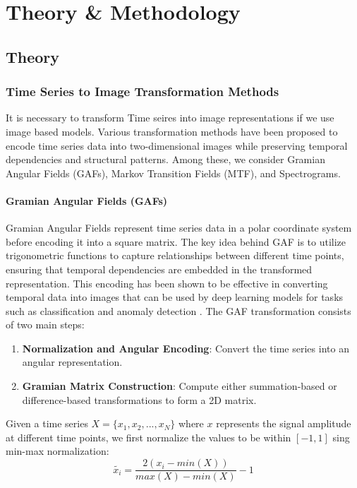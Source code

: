 \chapter{Theory \& Methodology}

\section{Theory}

\subsection{Time Series to Image Transformation Methods}

It is necessary to transform Time seires into image representations if we use image based models. Various transformation methods have been proposed to encode time series data into two-dimensional images while preserving temporal dependencies and structural patterns. Among these, we consider Gramian Angular Fields (GAFs), Markov Transition Fields (MTF), and Spectrograms.

\subsubsection*{Gramian Angular Fields (GAFs)}

Gramian Angular Fields represent time series data in a polar coordinate system before encoding it into a square matrix. The key idea behind GAF is to utilize trigonometric functions to capture relationships between different time points, ensuring that temporal dependencies are embedded in the transformed representation. This encoding has been shown to be effective in converting temporal data into images that can be used by deep learning models for tasks such as classification and anomaly detection \parencite{wang2015encoding}. The GAF transformation consists of two main steps:

\begin{enumerate}
    \item \textbf{Normalization and Angular Encoding}: Convert the time series into an angular representation.
    \item \textbf{Gramian Matrix Construction}: Compute either summation-based or difference-based transformations to form a 2D matrix.
\end{enumerate}

 Given a time series $ X = \{ x_{1}, x_{2}, ... , x_{N} \} $  where $x$ represents the signal amplitude at different time points, we first normalize the values to be within $[-1,1]$ sing min-max normalization:
\begin{equation}
    \tilde{x_{i}} = \frac{2(x_{i} - min(X))}{max(X) - min(X)} -1
\end{equation}

